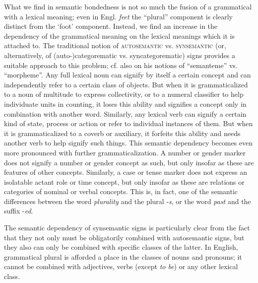 What we find in semantic bondedness is not so much the fusion of a grammatical with a lexical meaning; even in Engl. \textit{feet} the ``plural'' component is clearly distinct from the ‘foot’ component. Instead, we find an increase in the dependency of the grammatical meaning on the lexical meanings which it is attached to. The traditional notion of \textsc{autosemantic} vs. \textsc{synsemantic} (or, alternatively, of (auto-)categorematic vs. syncategorematic) signs provides a suitable approach to this problem; cf. also \citet[230 ]{Hjelmslev1928} on his notions of ``semanteme'' vs. ``morpheme''. Any full lexical noun can signify by itself a certain concept and can independently refer to a certain class of objects. But when it is grammaticalized to a noun of multitude to express collectivity, or to a numeral classifier to help individuate units in counting, it loses this ability and signifies a concept only in combination with another word. Similarly, any lexical verb can signify a certain kind of state, process or action or refer to individual instances of them. But when it is grammaticalized to a coverb or auxiliary, it forfeits this ability and needs another verb to help signify such things. This semantic dependency becomes even more pronounced with further grammaticalization. A number or gender marker does not signify a number or gender concept as such, but only insofar as these are features of other concepts. Similarly, a case or tense marker does not express an isolatable actant role or time concept, but only insofar as these are relations or categories of nominal or verbal concepts. This is, in fact, one of the semantic differences between the word \textit{plurality} and the plural -\textit{s}, or the word \textit{past} and the suffix -\textit{ed}.

The semantic dependency of synsemantic signs is particularly clear from the fact that they not only must be obligatorily combined with autosemantic signs, but they also can only be combined with specific classes of the latter. In English, grammatical plural is afforded a place in the classes of nouns and pronouns; it cannot be combined with adjectives, verbs (except \textit{to be}) or any other lexical class.

